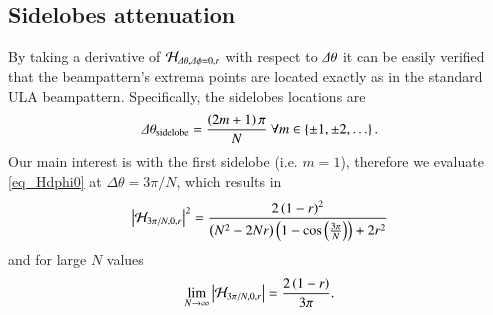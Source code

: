 \subsection{Sidelobes attenuation}
\ifdefined\showDev
\else
\fi
By taking a derivative of $\mathcal{H}_{\Delta\theta,\Delta\phi=0,r}$ with respect to $\Delta\theta$ it can be easily verified that the beampattern's extrema points are located exactly as in the standard ULA beampattern. Specifically, the sidelobes locations are
\begin{equation}
    \label{eqn_CB_sidelobesLocations}
    \Delta\theta_{\text{sidelobe}} = \frac{\left({2m+1}\right)\pi}{N}\ \forall m\in\left\{{\pm 1,\pm 2,\hdots}\right\}.
\end{equation}
Our main interest is with the first sidelobe (i.e. $m=1$), therefore we evaluate \eqref{eq_Hdphi0} at $\Delta\theta = 3\pi/N$, which results in
\begin{equation}
    \left\vert\mathcal{H}_{{3\pi}/{N},0,r}\right\vert^2
    =
    \frac{
    2\left({1-r}\right)^{2}
    }{
    \left({N^{2}-2Nr}\right)\left({1-\cos{\left({\frac{3\pi}{N}}\right)}}\right)+2r^{2}
    }
    \label{eq_HSidelobes}
\end{equation}
and for large $N$ values 
\begin{equation*}
    \lim_{N\rightarrow\infty}\left\vert\mathcal{H}_{3\pi/N,0,r}\right\vert=\frac{
    2\left({1-r}\right)
    }{
    3\pi
    }.
\end{equation*}
